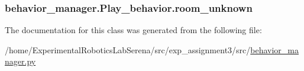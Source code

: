 \subsubsection[{\texorpdfstring{room\+\_\+unknown}{room_unknown}}]{\setlength{\rightskip}{0pt plus 5cm}behavior\+\_\+manager.\+Play\+\_\+behavior.\+room\+\_\+unknown}\hypertarget{classbehavior__manager_1_1Play__behavior_a8e31d349144e193480484d2a03dd3a7a}{}\label{classbehavior__manager_1_1Play__behavior_a8e31d349144e193480484d2a03dd3a7a}


The documentation for this class was generated from the following file\+:\begin{DoxyCompactItemize}
\item 
/home/\+Experimental\+Robotics\+Lab\+Serena/src/exp\+\_\+assignment3/src/\hyperlink{behavior__manager_8py}{behavior\+\_\+manager.\+py}\end{DoxyCompactItemize}
